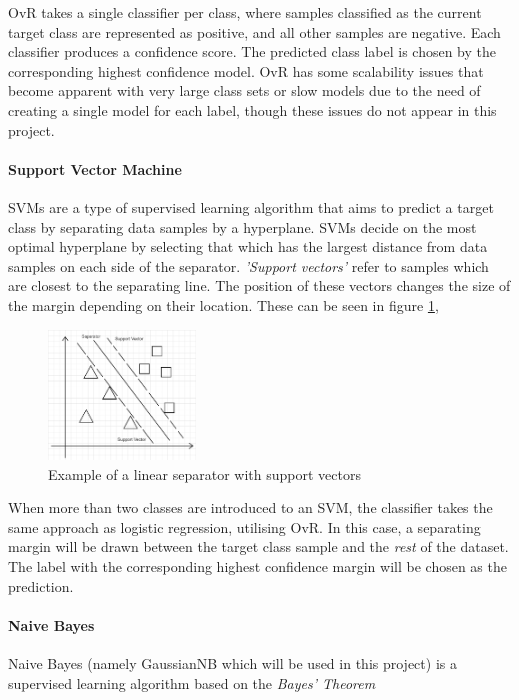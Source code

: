 \documentclass[conference]{IEEEtran}
\begin{document}
OvR takes a single classifier per class, where samples classified as the current target class are represented as positive, and all other samples are negative\cite{b8}. Each classifier produces a confidence score. The predicted class label is chosen by the corresponding highest confidence model. OvR has some scalability issues that become apparent with very large class sets or slow models due to the need of creating a single model for each label, though these issues do not appear in this project.\\

\paragraph{\textbf{Support Vector Machine}} SVMs are a type of supervised learning algorithm that aims to predict a target class by separating data samples by a hyperplane. SVMs decide on the most optimal hyperplane by selecting that which has the largest distance from data samples on each side of the separator. \textit{'Support vectors'} refer to samples which are closest to the separating line. The position of these vectors changes the size of the margin depending on their location. These can be seen in figure \ref{fig:support_vectors},

\begin{figure}[h]
    \centering
    \includegraphics[width=0.35\textwidth]{Support_vectors.png}
    \caption{Example of a linear separator with support vectors}
    \label{fig:support_vectors}
\end{figure}

When more than two classes are introduced to an SVM, the classifier takes the same approach as logistic regression, utilising OvR. In this case, a separating margin will be drawn between the target class sample and the \textit{rest} of the dataset. The label with the corresponding highest confidence margin will be chosen as the prediction.\\

\paragraph{\textbf{Naive Bayes}}
Naive Bayes (namely GaussianNB which will be used in this project) is a supervised learning algorithm based on the \textit{Bayes' Theorem}
\end{document}
